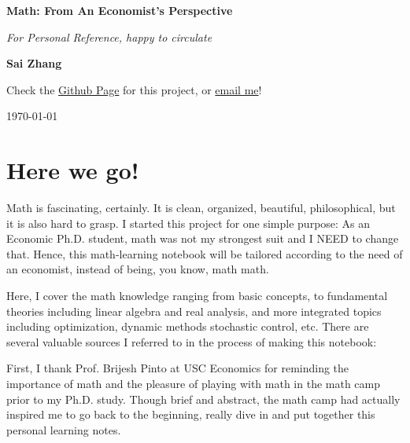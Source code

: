 \documentclass[12pt,openany]{report}
\begin{document}
\begin{titlepage}
    \begin{center}
        \vspace*{1cm}
        
        \Huge
        \textbf{Math: From An Economist's Perspective}

        \Large
        \textit{For Personal Reference, happy to circulate}
            
        \vspace{2.5cm}
        
        \LARGE    
        \textbf{Sai Zhang}
            
        \vfill
        
        \large    
        Check the \href{https://github.com/SaiChrisZHANG/Math-in-Economics}{Github Page} for this project, or \href{mailto:saizhang.econ@gmail.com}{email me}!

        \vspace{0.8cm}
        \large
        \today
            
    \end{center}
\end{titlepage}


\chapter*{Here we go!}

Math is fascinating, certainly. It is clean, organized, beautiful, philosophical,
but it is also hard to grasp. I started this project for one simple purpose: As an Economic Ph.D. student, 
math was not my strongest suit and I NEED to change that. Hence, this
math-learning notebook will be tailored according to the need of an economist,
instead of being, you know, math math.

Here, I cover the math knowledge ranging from basic concepts, to fundamental theories including 
linear algebra and real analysis, and more integrated topics including optimization, dynamic methods stochastic control, etc.
There are several valuable sources I referred to in the process of making this notebook:

First, I thank Prof. Brijesh Pinto at USC Economics for reminding the importance of math and the pleasure of 
playing with math in the math camp prior to my Ph.D. study. Though brief and abstract, the math camp had actually inspired
me to go back to the beginning, really dive in and put together this personal learning notes.
\end{document}
